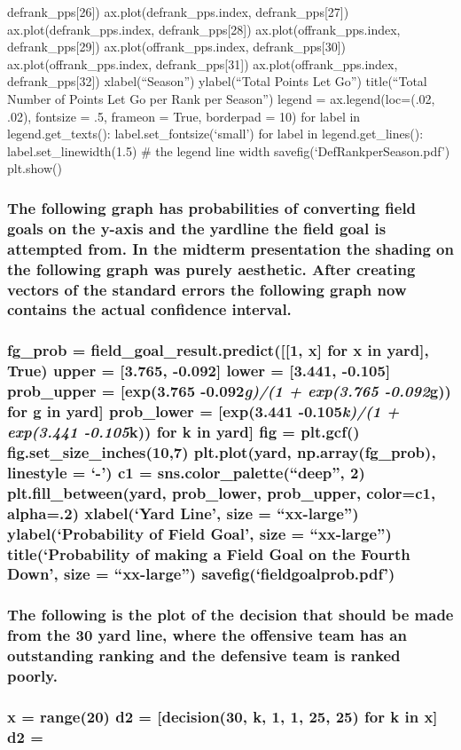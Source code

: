 \documentclass[letterpaper,10pt,english]{/anaconda/lib/python2.7/site-packages/sphinx/texinputs/sphinxhowto}
\begin{document}
{defrank\_pps{[}26{]}) ax.plot(defrank\_pps.index, defrank\_pps{[}27{]})
ax.plot(defrank\_pps.index, defrank\_pps{[}28{]})
ax.plot(offrank\_pps.index, defrank\_pps{[}29{]})
ax.plot(offrank\_pps.index, defrank\_pps{[}30{]})
ax.plot(offrank\_pps.index, defrank\_pps{[}31{]})
ax.plot(offrank\_pps.index, defrank\_pps{[}32{]}) xlabel(``Season'')
ylabel(``Total Points Let Go'') title(``Total Number of Points Let Go
per Rank per Season'') legend = ax.legend(loc=(.02, .02), fontsize = .5,
frameon = True, borderpad = 10) for label in legend.get\_texts():
label.set\_fontsize(`small') for label in legend.get\_lines():
label.set\_linewidth(1.5) \# the legend line width
savefig(`DefRankperSeason.pdf') plt.show()}\subsubsection{The following graph has probabilities of converting field goals on the
y-axis and the yardline the field goal is attempted from. In the midterm
presentation the shading on the following graph was purely aesthetic.
After creating vectors of the standard errors the following graph now
contains the actual confidence interval.}\subsubsection{fg\_prob = field\_goal\_result.predict({[}{[}1, x{]} for x in yard{]},
True) upper = {[}3.765, -0.092{]} lower = {[}3.441, -0.105{]}
prob\_upper = {[}exp(3.765 -0.092\emph{g)/(1 + exp(3.765 -0.092}g)) for
g in yard{]} prob\_lower = {[}exp(3.441 -0.105\emph{k)/(1 + exp(3.441
-0.105}k)) for k in yard{]} fig = plt.gcf() fig.set\_size\_inches(10,7)
plt.plot(yard, np.array(fg\_prob), linestyle = `-') c1 =
sns.color\_palette(``deep'', 2) plt.fill\_between(yard, prob\_lower,
prob\_upper, color=c1, alpha=.2) xlabel(`Yard Line', size =
``xx-large'') ylabel(`Probability of Field Goal', size = ``xx-large'')
title(`Probability of making a Field Goal on the Fourth Down', size =
``xx-large'') savefig(`fieldgoalprob.pdf')}\subsubsection{The following is the plot of the decision that should be made from the
30 yard line, where the offensive team has an outstanding ranking and
the defensive team is ranked poorly.}\subsubsection{x = range(20) d2 = {[}decision(30, k, 1, 1, 25, 25) for k in x{]} d2 =
}
\end{document}
